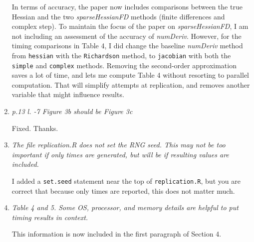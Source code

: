 \documentclass{article}
\newcommand{\pkg}[1]{\emph{#1}}
\newcommand{\filename}[1]{\texttt{#1}}
\newcommand{\code}[1]{\texttt{#1}}
\newcommand{\func}[1]{\code{#1}}
\newcommand{\class}[1]{\textsl{#1}}
\newcommand{\method}[1]{\func{#1}}
\newenvironment{revQuote}{\itshape}{\vspace{\baselineskip}}
\newenvironment{response}{\normalfont}{\vspace{\baselineskip}}
\begin{document}
\begin{enumerate}[align=left]
\begin{response}
In terms of accuracy, the paper now includes comparisons between the true
Hessian and the two \class{sparseHessianFD} methods (finite differences
and complex step). To maintain the focus of the paper on
\pkg{sparseHessianFD}, I am not including an assessment of the accuracy of
\pkg{numDeriv}.  However, for the
timing comparisons in Table 4, I did
change the baseline \pkg{numDeriv} method from \func{hessian} with the
\method{Richardson} method, to \func{jacobian} with both the
\method{simple} and 
\method{complex} methods. Removing the second-order approximation saves
a lot of time, and lets me compute Table 4 without resorting to
parallel computation. That will simplify attempts at replication, and
removes another variable that might influence results.



\end{response}


\item \begin{revQuote}
 p.13  l. -7  Figure 3b  should be Figure 3c
  \end{revQuote}

\begin{response}
  Fixed.  Thanks.
\end{response}


\item \begin{revQuote}
 The file replication.R does not set the RNG seed. This may not be too
important if only times are generated, but will be if resulting values are
included.
    
  \end{revQuote}

\begin{response}
  I added a \func{set.seed} statement near the top of
  \filename{replication.R}, but you are correct that because only
  times are reported, this does not matter much.
\end{response}


\item \begin{revQuote}
Table 4 and 5. Some OS, processor, and memory details are helpful to put
timing results in context.
  \end{revQuote}

\begin{response}
  This information is now included in the first paragraph of Section 4.
\end{response}



\end{enumerate}
\end{document}
